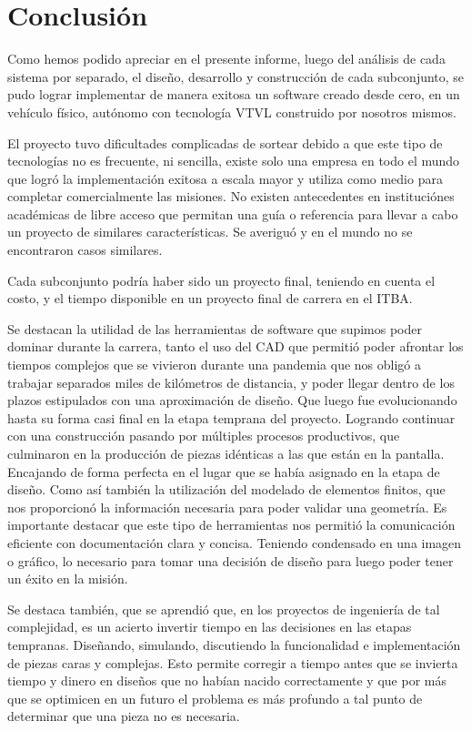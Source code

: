 \section{Conclusión}\label{sec:conclusion}

Como hemos podido apreciar en el presente informe, luego del análisis de cada sistema por separado, el diseño, desarrollo y construcción de cada subconjunto, se pudo lograr implementar de manera exitosa un software creado desde cero, en un vehículo físico, autónomo con tecnología VTVL construido por nosotros mismos.

\medskip

El proyecto tuvo dificultades complicadas de sortear debido a que este tipo de tecnologías no es frecuente, ni sencilla, existe solo una empresa en todo el mundo que logró la implementación exitosa a escala mayor y utiliza como medio para completar comercialmente las misiones. No existen antecedentes en instituciónes académicas de libre acceso que permitan una guía o referencia para llevar a cabo un proyecto de similares características. Se averiguó y en el mundo no se encontraron casos similares.

Cada subconjunto podría haber sido un proyecto final, teniendo en cuenta el costo, y el tiempo disponible en un proyecto final de carrera en el ITBA.

Se destacan la utilidad de las herramientas de software que supimos poder dominar durante la carrera, tanto el uso del CAD que permitió poder afrontar los tiempos complejos que se vivieron durante una pandemia que nos obligó a trabajar separados miles de kilómetros de distancia, y poder llegar dentro de los plazos estipulados con una aproximación de diseño. Que luego fue evolucionando hasta su forma casi final en la etapa temprana del proyecto. Logrando continuar con una construcción pasando por múltiples procesos productivos, que culminaron en la producción de piezas idénticas a las que están en la pantalla. Encajando de forma perfecta en el lugar que se había asignado en la etapa de diseño. Como así también la utilización del modelado de elementos finitos, que nos proporcionó la información necesaria para poder validar una geometría. Es importante destacar que este tipo de herramientas nos permitió la comunicación eficiente con documentación clara y concisa. Teniendo condensado en una imagen o gráfico, lo necesario para tomar una decisión de diseño para luego poder tener un éxito en la misión.

\medskip

Se destaca también, que se aprendió que, en los proyectos de ingeniería de tal complejidad, es un acierto invertir tiempo en las decisiones en las etapas tempranas. Diseñando, simulando, discutiendo la funcionalidad e implementación de piezas caras y complejas. Esto permite corregir a tiempo antes que se invierta tiempo y dinero en diseños que no habían nacido correctamente y que por más que se optimicen en un futuro el problema es más profundo a tal punto de determinar que una pieza no es necesaria.

